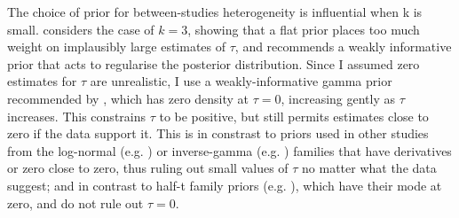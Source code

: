 The choice of prior for between-studies heterogeneity is influential when k is small\autocite{seide2019LikelihoodbasedRandomeffectsMetaanalysis}.
\textcite{gelman2006PriorDistributionsVariance} considers the case of $k=3$, showing that a flat prior places too much weight on implausibly large estimates of $\tau$, and recommends a weakly informative prior that acts to regularise the posterior distribution.
%
%
Since I assumed zero estimates for $\tau$ are unrealistic, I use a weakly-informative gamma prior recommended by \autocite{chung2013NondegeneratePenalizedLikelihood}, which has zero density at $\tau = 0$, increasing gently as $\tau$ increases.
This constrains $\tau$ to be positive, but still permits estimates close to zero if the data support it.
This is in constrast to priors used in other studies from the log-normal (e.g. \autocite{pullenayegum2011InformedReferencePrior,turner2015PredictiveDistributionsBetweenstudy}) or inverse-gamma (e.g. \autocite{higgins1996BorrowingStrengthExternal}) families that have derivatives or zero close to zero, thus ruling out small values of $\tau$ no matter what the data suggest; and in contrast to half-t family priors (e.g. \autocite{gelman2006PriorDistributionsVariance,seide2019LikelihoodbasedRandomeffectsMetaanalysis}), which have their mode at zero, and do not rule out $\tau=0$.

